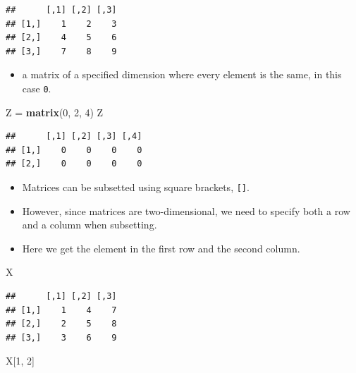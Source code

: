 \documentclass[]{book}
\newenvironment{Shaded}{\begin{snugshade}}{\end{snugshade}}
\newcommand{\KeywordTok}[1]{\textcolor[rgb]{0.13,0.29,0.53}{\textbf{#1}}}
\newcommand{\DecValTok}[1]{\textcolor[rgb]{0.00,0.00,0.81}{#1}}
\newcommand{\StringTok}[1]{\textcolor[rgb]{0.31,0.60,0.02}{#1}}
\newcommand{\NormalTok}[1]{#1}
\providecommand{\tightlist}{%
  \setlength{\itemsep}{0pt}\setlength{\parskip}{0pt}}
\begin{document}
\begin{verbatim}
##      [,1] [,2] [,3]
## [1,]    1    2    3
## [2,]    4    5    6
## [3,]    7    8    9
\end{verbatim}

\begin{itemize}
\tightlist
\item
  a matrix of a specified dimension where every element is the same, in
  this case \texttt{0}.
\end{itemize}

\begin{Shaded}
\begin{Highlighting}[]
\NormalTok{Z =}\StringTok{ }\KeywordTok{matrix}\NormalTok{(}\DecValTok{0}\NormalTok{, }\DecValTok{2}\NormalTok{, }\DecValTok{4}\NormalTok{)}
\NormalTok{Z}
\end{Highlighting}
\end{Shaded}

\begin{verbatim}
##      [,1] [,2] [,3] [,4]
## [1,]    0    0    0    0
## [2,]    0    0    0    0
\end{verbatim}

\begin{itemize}
\tightlist
\item
  Matrices can be subsetted using square brackets, \texttt{{[}{]}}.
\item
  However, since matrices are two-dimensional, we need to specify both a
  row and a column when subsetting.
\item
  Here we get the element in the first row and the second column.
\end{itemize}

\begin{Shaded}
\begin{Highlighting}[]
\NormalTok{X}
\end{Highlighting}
\end{Shaded}

\begin{verbatim}
##      [,1] [,2] [,3]
## [1,]    1    4    7
## [2,]    2    5    8
## [3,]    3    6    9
\end{verbatim}

\begin{Shaded}
\begin{Highlighting}[]
\NormalTok{X[}\DecValTok{1}\NormalTok{, }\DecValTok{2}\NormalTok{]}
\end{Highlighting}
\end{Shaded}
\end{document}

